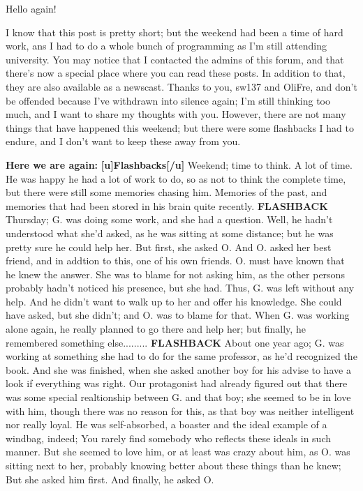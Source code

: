 Hello again!

I know that this post is pretty short; but the weekend had been a time of hard work, ans I had to do a whole bunch of programming as I'm still attending university. 
You may notice that I contacted the admins of this forum, and that there's now a special place where you can read these posts. In addition to that, they are also available as a newscast. 
Thanks to you, sw137 and OliFre, and don't be offended because I've withdrawn into silence again; I'm still thinking too much, and I want to share my thoughts with you. 
However, there are not many things that have happened this weekend; but there were some flashbacks I had to endure, and I don't want to keep these away from you. 

\textbf{Here we are again:}
\textbf{[u]Flashbacks[/u]}
Weekend; time to think. 
A lot of time. 
He was happy he had a lot of work to do, so as not to think the complete time, but there were still some memories chasing him. Memories of the past, and memories that had been stored in his brain quite recently. 
\textbf{FLASHBACK}
Thursday; G. was doing some work, and she had a question. Well, he hadn't understood what she'd asked, as he was sitting at some distance; but he was pretty sure he could help her. 
But first, she asked O. 
And O. asked her best friend, and in addtion to this, one of his own friends. 
O. must have known that he knew the answer. 
She was to blame for not asking him, as the other persons probably hadn't noticed his presence, but she had. Thus, G. was left without any help. And he didn't want to walk up to her and offer his knowledge. She could have asked, but she didn't; and O. was to blame for that. 
When G. was working alone again, he really planned to go there and help her; but finally, he remembered something else.........
\textbf{FLASHBACK}
About one year ago; G. was working at something she had to do for the same professor, as he'd recognized the book. And she was finished, when she asked another boy for his advise to have a look if everything was right. 
Our protagonist had already figured out that there was some special realtionship between G. and that boy; she seemed to be in love with him, though there was no reason for this, as that boy was neither intelligent nor really loyal. He was self-absorbed, a boaster and the ideal example of a windbag, indeed; You rarely find somebody who reflects these ideals in such manner. 
But she seemed to love him, or at least was crazy about him, as O. was sitting next to her, probably knowing better about these things than he knew; But she asked him first. And finally, he asked O. 
